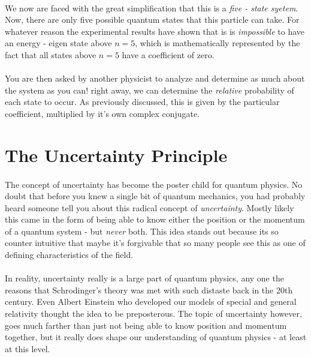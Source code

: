 \documentclass[12pt,letterpaper]{book}
\begin{document}
\paragraph*{}We now are faced with the great simplification that this is a \textit{five - state syetem}. Now, there are only five possible quantum states that this particle can take. For whatever reason the experimental results have shown that is is \textit{impossible} to have an energy - eigen state above $n = 5$, which is mathematically represented by the fact that all states above $n = 5$ have a coefficient of zero. 
\paragraph*{}You are then asked by another physicist to analyze and determine as much about the system as you can! right away, we can determine the \textit{relative} probability of each state to occur. As previously discussed, this is given by the particular coefficient, multiplied by it's own complex conjugate.




\section{The Uncertainty Principle}
\paragraph*{}The concept of uncertainty has become the poster child for quantum physics. No doubt that before you knew a single bit of quantum mechanics, you had probably heard someone tell you about this radical concept of \textit{uncertainty}. Mostly likely this came in the form of being able to know either the position or the momentum of a quantum system - but \textit{never} both. This idea stands out because its so counter intuitive that maybe it's forgivable that so many people see this as one of defining characteristics of the field.
\paragraph*{}In reality, uncertainty really is a large part of quantum physics, any one the reasons that Schrodinger's theory was met with such distaste back in the 20th century. Even Albert Einstein who developed our models of special and general relativity thought the idea to be preposterous. The topic of uncertainty however, goes much farther than just not being able to know position and momentum together, but it really does shape our understanding of quantum physics - at least at this level.
\end{document}
